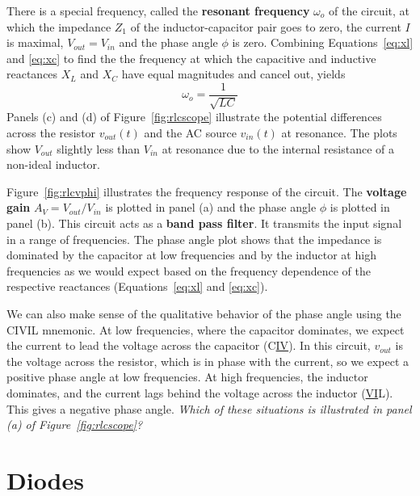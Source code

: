 \documentclass[11pt]{article}
\begin{document}
There is a special frequency, called the \textbf{resonant frequency}
$\omega_o$ of the circuit, at which 
the impedance $Z_1$ of the inductor-capacitor pair goes to zero, the
current $I$ is maximal, $V_{out} = V_{in}$ and the phase angle
$\phi$ is zero. Combining Equations~\ref{eq:xl} and \ref{eq:xc} to
find the the frequency at which the capacitive and inductive
reactances $X_L$ and $X_C$ have equal magnitudes and cancel out,
yields  
\begin{equation}
  \omega_o = \frac{1}{\sqrt{LC}}
  \label{eq:rlcomega}
\end{equation}
Panels (c) and (d) of Figure~\ref{fig:rlcscope} illustrate the
potential differences across the resistor $v_{out}(t)$ and the AC
source $v_{in}(t)$ at resonance. The plots show $V_{out}$ slightly
less than $V_{in}$ at resonance due to the internal resistance of a
non-ideal inductor.

Figure~\ref{fig:rlcvphi} illustrates the frequency response of the
circuit. The \textbf{voltage gain} $A_V = V_{out}/V_{in}$ is plotted
in panel (a) and the phase angle $\phi$ is plotted in panel (b). This
circuit acts as a \textbf{band pass filter}. It transmits the input
signal in a range of frequencies. The phase angle plot shows that the
impedance is dominated by the capacitor at low frequencies and by the
inductor at high frequencies as we would expect based on the frequency
dependence of the respective reactances (Equations~\ref{eq:xl} and 
\ref{eq:xc}).

We can also make sense of the qualitative behavior of the phase angle
using the CIVIL mnemonic. At low frequencies, where the capacitor
dominates, we expect the current to lead the voltage across the
capacitor (C\underline{IV}). In this circuit, $v_{out}$ is the voltage
across the resistor, which is in phase with the current, so we expect
a positive phase angle at low frequencies. At high frequencies, the
inductor dominates, and the current lags behind the voltage across the
inductor (\underline{VI}L). This gives a negative phase
angle. \emph{Which of these situations is illustrated in panel (a) of
  Figure~\ref{fig:rlcscope}?}

\newpage

\section{Diodes}
\label{sec:diodes}
\end{document}
